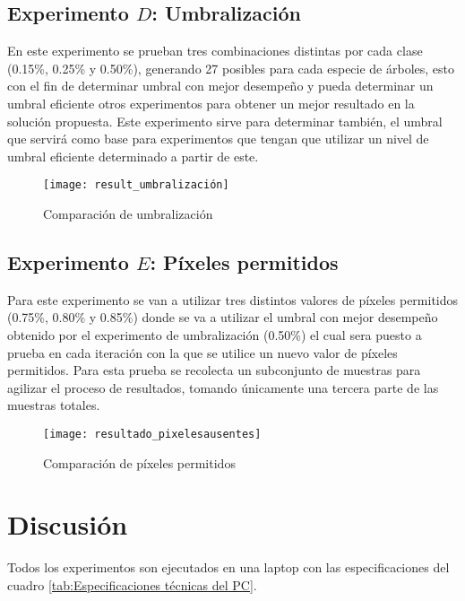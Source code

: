 \clearpage
\subsection{Experimento $D$: Umbralización}
En este experimento se prueban tres combinaciones distintas por cada clase (0.15\%, 0.25\% y 0.50\%), generando 27 posibles para cada especie de árboles, esto con el fin de determinar umbral con mejor desempeño y pueda determinar un umbral eficiente otros experimentos para obtener un mejor resultado en la solución propuesta. Este experimento sirve para determinar también, el umbral que servirá como base para experimentos que tengan que utilizar un nivel de umbral eficiente determinado a partir de este.


\begin{figure}[h!]
  \centering  
    \texttt{[image: result\_umbralización]}
    \caption{Comparación de umbralización} 
    \label{Comparación de umbralización}
\end{figure}

\clearpage

\subsection{Experimento $E$: Píxeles permitidos}
Para este experimento se van a utilizar tres distintos valores de píxeles permitidos (0.75\%, 0.80\% y 0.85\%) donde se va a utilizar el umbral con mejor desempeño obtenido por el experimento de umbralización (0.50\%) el cual sera puesto a prueba en cada iteración con la que se utilice un nuevo valor de píxeles permitidos. Para esta prueba se recolecta un subconjunto de muestras para agilizar el proceso de resultados, tomando únicamente una tercera parte de las muestras totales.

\begin{figure}[h!]
  \centering  
\texttt{[image: resultado\_pixelesausentes]}
    \caption{Comparación de píxeles permitidos} 
    \label{Comparación de píxeles permitidos}
\end{figure}

\clearpage
\section{Discusión}
Todos los experimentos son ejecutados en una laptop con las especificaciones del cuadro \ref{tab:Especificaciones técnicas del PC}.

